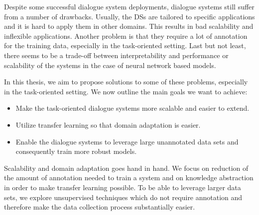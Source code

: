 Despite some successful dialogue system deployments, dialogue systems still suffer from a number of drawbacks.
Usually, the DSs are tailored to specific applications and it is hard to apply them in other domains.
This results in bad scalability and inflexible applications.
Another problem is that they require a lot of annotation for the training data, especially in the task-oriented setting.
Last but not least, there seems to be a trade-off between interpretability and performance or scalability of the systems in the case of neural network based models.

In this thesis, we aim to propose solutions to some of these problems, especially in the task-oriented setting.
We now outline the main goals we want to achieve:
\begin{itemize}
    \item Make the task-oriented dialogue systems more scalable and easier to extend.
    \item Utilize transfer learning so that domain adaptation is easier.
    \item Enable the dialogue systems to leverage large unannotated data sets and consequently train more robust models.
\end{itemize}
Scalability and domain adaptation goes hand in hand.
We focus on reduction of the amount of annotation needed to train a system and on knowledge abstraction in order to make transfer learning possible.
To be able to leverage larger data sets, we explore unsupervised techniques which do not require annotation and therefore make the data collection process substantially easier.



